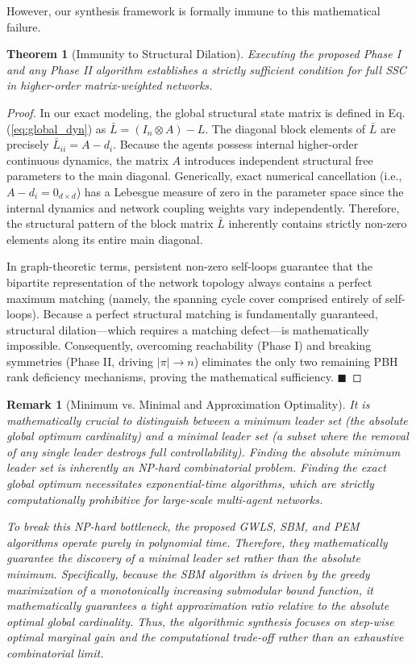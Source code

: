 \documentclass{IEEEtran}
\newtheorem{theorem}{Theorem}
\newtheorem{remark}{Remark}
\begin{document}
	However, our synthesis framework is formally immune to this mathematical failure. 
	
	\begin{theorem}[Immunity to Structural Dilation]
		Executing the proposed Phase I and any Phase II algorithm establishes a strictly sufficient condition for full SSC in higher-order matrix-weighted networks.
	\end{theorem}
	\begin{proof}
		In our exact modeling, the global structural state matrix is defined in Eq. (\ref{eq:global_dyn}) as $\bar{L} = (I_n \otimes A) - L$. The diagonal block elements of $\bar{L}$ are precisely $\bar{L}_{ii} = A - d_i$. Because the agents possess internal higher-order continuous dynamics, the matrix $A$ introduces independent structural free parameters to the main diagonal. Generically, exact numerical cancellation (i.e., $A - d_i = 0_{d \times d}$) has a Lebesgue measure of zero in the parameter space since the internal dynamics and network coupling weights vary independently. Therefore, the structural pattern of the block matrix $\bar{L}$ inherently contains strictly non-zero elements along its entire main diagonal. 
		
		In graph-theoretic terms, persistent non-zero self-loops guarantee that the bipartite representation of the network topology always contains a perfect maximum matching (namely, the spanning cycle cover comprised entirely of self-loops). Because a perfect structural matching is fundamentally guaranteed, structural dilation—which requires a matching defect—is mathematically impossible. Consequently, overcoming reachability (Phase I) and breaking symmetries (Phase II, driving $|\pi| \to n$) eliminates the only two remaining PBH rank deficiency mechanisms, proving the mathematical sufficiency. \hfill $\blacksquare$
	\end{proof}
	
	\begin{remark}[Minimum vs. Minimal and Approximation Optimality]
		It is mathematically crucial to distinguish between a minimum leader set (the absolute global optimum cardinality) and a minimal leader set (a subset where the removal of any single leader destroys full controllability). Finding the absolute minimum leader set is inherently an NP-hard combinatorial problem. Finding the exact global optimum necessitates exponential-time algorithms, which are strictly computationally prohibitive for large-scale multi-agent networks. 
		
		To break this NP-hard bottleneck, the proposed GWLS, SBM, and PEM algorithms operate purely in polynomial time. Therefore, they mathematically guarantee the discovery of a \textit{minimal} leader set rather than the absolute \textit{minimum}. Specifically, because the SBM algorithm is driven by the greedy maximization of a monotonically increasing submodular bound function, it mathematically guarantees a tight approximation ratio relative to the absolute optimal global cardinality. Thus, the algorithmic synthesis focuses on step-wise optimal marginal gain and the computational trade-off rather than an exhaustive combinatorial limit.
	\end{remark}
	
\end{document}
